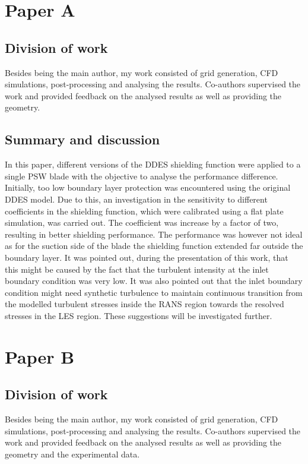 \section{Paper A} 
\subsection{Division of work}
Besides being the main author, my work consisted of grid generation, CFD simulations, post-processing and analysing the results. Co-authors supervised the work and provided feedback on the analysed results as well as providing the geometry.
\subsection{Summary and discussion}
In this paper, different versions of the DDES shielding function were applied to a single PSW blade with the objective to analyse the performance difference. Initially, too low boundary layer protection was encountered using the original DDES model. Due to this, an investigation in the sensitivity to different coefficients in the shielding function, which were calibrated using a flat plate simulation, was carried out. The coefficient was increase by a factor of two, resulting in better shielding performance. The performance was however not ideal as for the suction side of the blade the shielding function extended far outside the boundary layer. It was pointed out, during the presentation of this work, that this might be caused by the fact that the turbulent intensity at the inlet boundary condition was very low. It was also pointed out that the inlet boundary condition might need synthetic turbulence to maintain continuous transition from the modelled turbulent stresses inside the RANS region towards the resolved stresses in the LES region. These suggestions will be investigated further.


\section{Paper B} 
\subsection{Division of work}
Besides being the main author, my work consisted of grid generation, CFD simulations, post-processing and analysing the results. Co-authors supervised the work and provided feedback on the analysed results as well as providing the geometry and the experimental data.
